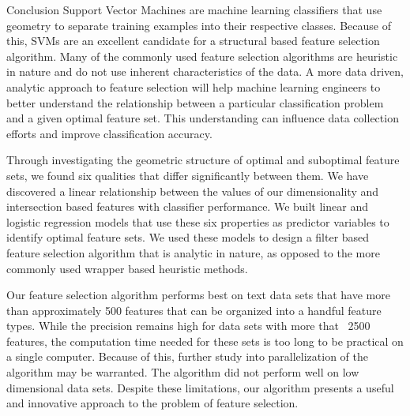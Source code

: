 \documentclass{llncs}
\begin{document}
\begin{section}{Conclusion}
Support Vector Machines are machine learning classifiers that use geometry to separate training examples into their respective classes. Because of this, SVMs are an excellent candidate for a structural based feature selection algorithm. Many of the commonly used feature selection algorithms are heuristic in nature and do not use inherent characteristics of the data. A more data driven, analytic approach to feature selection will help machine learning engineers to better understand the relationship between a particular classification problem and a given optimal feature set. This understanding can influence data collection efforts and improve classification accuracy.


Through investigating the geometric structure of optimal and suboptimal feature sets, we found six qualities that differ significantly between them. We have discovered a linear relationship between the values of our dimensionality and intersection based features with classifier performance. We built linear and logistic regression models that use these six properties as predictor variables to identify optimal feature sets. We used these models to design a filter based feature selection algorithm that is analytic in nature, as opposed to the more commonly used wrapper based heuristic methods. 


Our feature selection algorithm performs best on text data sets that have more than approximately 500 features that can be organized into a handful feature types. While the precision remains high for data sets with more that ~2500 features, the computation time needed for these sets is too long to be practical on a single computer. Because of this, further study into parallelization of the algorithm may be warranted.
The algorithm did not perform well on low dimensional data sets. Despite these limitations, our algorithm presents a useful and innovative approach to the problem of feature selection.
\end{section}



\end{document}
